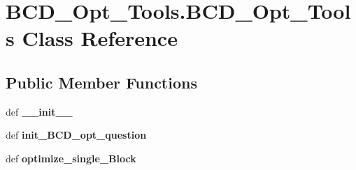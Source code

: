 \hypertarget{classBCD__Opt__Tools_1_1BCD__Opt__Tools}{}\section{B\+C\+D\+\_\+\+Opt\+\_\+\+Tools.\+B\+C\+D\+\_\+\+Opt\+\_\+\+Tools Class Reference}
\label{classBCD__Opt__Tools_1_1BCD__Opt__Tools}
\subsection*{Public Member Functions}
\begin{DoxyCompactItemize}
\item 
\mbox{\label{classBCD__Opt__Tools_1_1BCD__Opt__Tools_a3819a25cfcdb54ee6ea8162af3a6db9b}} 
def {\bfseries \+\_\+\+\_\+init\+\_\+\+\_\+}
\item 
\mbox{\label{classBCD__Opt__Tools_1_1BCD__Opt__Tools_a14254f3e4158804b92c492ab0c4b43a5}} 
def {\bfseries init\+\_\+\+B\+C\+D\+\_\+opt\+\_\+question}
\item 
\mbox{\label{classBCD__Opt__Tools_1_1BCD__Opt__Tools_ab22253ba9f0d25d7be17660b0b56750d}} 
def {\bfseries optimize\+\_\+single\+\_\+\+Block}
\end{DoxyCompactItemize}
